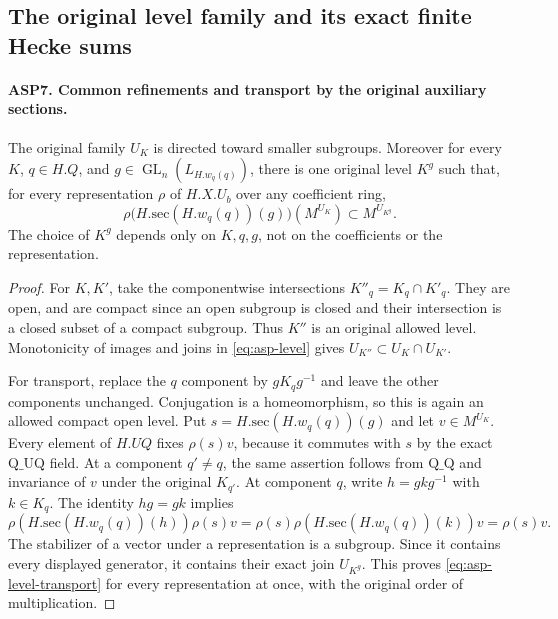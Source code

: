 \subsection{The original level family and its exact finite Hecke sums}

\paragraph{ASP7. Common refinements and transport by the original auxiliary sections.}
\label{claim:ASP7}
The original family $U_K$ is directed toward smaller
subgroups.  Moreover for every $K$, $q\in H.Q$, and
$g\in\operatorname{GL}_n(L_{H.w_q(q)})$, there is
one original level $K^g$ such that, for every
representation $\rho$ of $H.X.U_b$ over any
coefficient ring,
\begin{equation}\label{eq:asp-level-transport}
 \rho\bigl(H.\mathrm{sec}(H.w_q(q))(g)\bigr)
                     (M^{U_K})\subset M^{U_{K^g}}.
\end{equation}
The choice of $K^g$ depends only on $K,q,g$, not
on the coefficients or the representation.
\begin{proof}
For $K,K'$, take the componentwise intersections
$K''_q=K_q\cap K'_q$.  They are open, and are
compact since an open subgroup is closed and
their intersection is a closed subset of a compact
subgroup.  Thus $K''$ is an original allowed
level.  Monotonicity of images and joins in
\eqref{eq:asp-level} gives
$U_{K''}\subset U_K\cap U_{K'}$.

For transport, replace the $q$ component by
$gK_qg^{-1}$ and leave the other components
unchanged.  Conjugation is a homeomorphism,
so this is again an allowed compact open level.
Put $s=H.\mathrm{sec}(H.w_q(q))(g)$ and let
$v\in M^{U_K}$.  Every element of $H.UQ$
fixes $\rho(s)v$, because it commutes with $s$
by the exact $\mathrm{Q\_UQ}$ field.  At a
component $q'\ne q$, the same assertion follows
from $\mathrm{Q\_Q}$ and invariance of $v$
under the original $K_{q'}$.  At component $q$,
write $h=gkg^{-1}$ with $k\in K_q$.  The
identity $hg=gk$ implies
\[
 \rho(H.\mathrm{sec}(H.w_q(q))(h))\rho(s)v
   =\rho(s)\rho(H.\mathrm{sec}(H.w_q(q))(k))v
   =\rho(s)v.
\]
The stabilizer of a vector under a representation
is a subgroup.  Since it contains every displayed
generator, it contains their exact join $U_{K^g}$.
This proves \eqref{eq:asp-level-transport} for every
representation at once, with the original order
of multiplication.
\end{proof}

